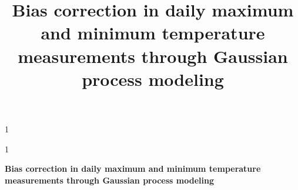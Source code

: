 \documentclass[12pt]{article}
\newcommand{\blind}{1}
\newcommand{\temptitle}{
	Bias correction in daily maximum and minimum temperature measurements through Gaussian process modeling
}
\begin{document}
\blind
{
\title{
    \Large
    \bf
    \temptitle
}
\author{\tempauthors}
\maketitle
} \fi

\blind
{
  \bigskip
  \bigskip
  \bigskip
  \begin{center}
    {\LARGE\bf \temptitle}
\end{center}
  \medskip
} \fi
    
\begin{abstract}

\end{abstract}
\graphicspath{{../figures/}}




%
%    
%
%    
%
%
%    
%
%
%    
%
%
%    
\end{document}
